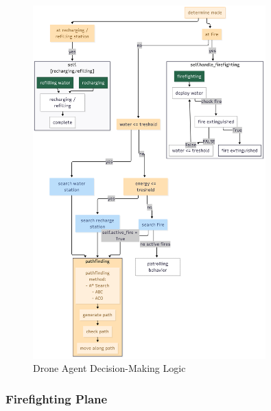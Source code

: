 \documentclass[11pt, a4paper]{article}
\begin{document}
\begin{figure}[!htbp]
  \centering
  \includegraphics[width=0.8\textwidth]{figures/DroneAgent_Logic.png}
  \caption{Drone Agent Decision-Making Logic}
  \label{fig:droneAgentlogic}
\end{figure}

\newpage
\subsubsection{Firefighting Plane}
\label{sec:PlaneAgent}
\end{document}
